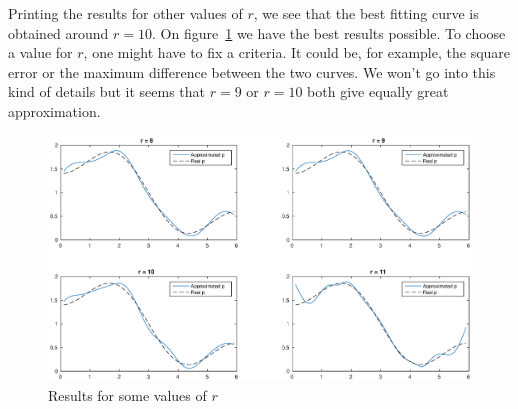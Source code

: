 Printing the results for other values of $r$, we see that the best fitting curve is obtained around $r=10$. On figure~\ref{fig:nn2} we have the best results possible. To choose a value for $r$, one might have to fix a criteria. It could be, for example, the square error or the maximum difference between the two curves. We won't go into this kind of details but it seems that $r=9$ or $r=10$ both give equally great approximation.


\begin{figure}[!h]
\centering
\includegraphics[scale = 0.5]{./nn2.eps}
\caption{Results for some values of $r$}
\label{fig:nn2}
\end{figure}



